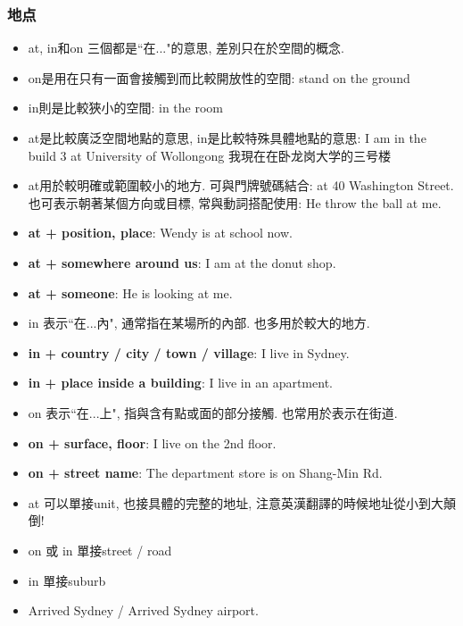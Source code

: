 \subsubsection{地点}
\begin{itemize}
  \itemsep0em
  \item at, in和on 三個都是``在..."的意思, 差別只在於空間的概念.
  \item on是用在只有一面會接觸到而比較開放性的空間: stand on the ground
  \item in則是比較狹小的空間: in the room
  \item at是比較廣泛空間地點的意思, in是比較特殊具體地點的意思: I am in the build 3 at University of Wollongong 我現在在卧龙岗大学的三号楼
\end{itemize}

\begin{itemize}
  \itemsep0em
  \item at用於較明確或範圍較小的地方. 可與門牌號碼結合: at 40 Washington Street. 也可表示朝著某個方向或目標, 常與動詞搭配使用: He throw the ball at me.
  \item \textbf{at + position, place}: Wendy is at school now.
  \item \textbf{at + somewhere around us}: I am at the donut shop.
  \item \textbf{at + someone}: He is looking at me.
\end{itemize}

\begin{itemize}
  \itemsep0em
  \item in 表示``在...內", 通常指在某場所的內部. 也多用於較大的地方.
  \item \textbf{in + country / city / town / village}: I live in Sydney.
  \item \textbf{in + place inside a building}: I live in an apartment.
\end{itemize}

\begin{itemize}
  \itemsep0em
  \item on 表示``在...上", 指與含有點或面的部分接觸. 也常用於表示在街道.
  \item \textbf{on + surface, floor}: I live on the 2nd floor.
  \item \textbf{on + street name}: The department store is on Shang-Min Rd.
\end{itemize}

\begin{itemize}
  \itemsep0em
  \item at 可以單接unit, 也接具體的完整的地址, 注意英漢翻譯的時候地址從小到大顛倒!
  \item on 或 in 單接street / road
  \item in 單接suburb
  \item Arrived  Sydney / Arrived  Sydney airport.
\end{itemize}

